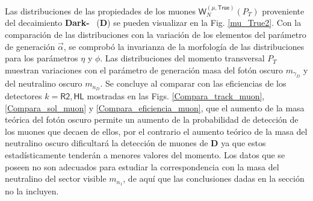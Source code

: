 Las distribuciones de las propiedades de los muones $\textsf{W}^{(\mu,\textsf{True})}_N (P_T)$ proveniente del decaimiento  \textbf{Dark-}\SUSY ~ (\MSSM\textbf{D}) 
se pueden visualizar en la Fig. \ref{mu_True2}. Con la comparación de las distribuciones con la variación de los elementos del parámetro de generación $\vec{\alpha}$, se comprobó la invarianza de la morfología de las distribuciones para los parámetros $\eta$ y $\phi$. Las distribuciones del momento transversal $P_T$ muestran variaciones con el parámetro de generación masa del fotón oscuro $m_{\gamma_D}$ y del neutralino oscuro $m_{n_D}$. Se concluye al comparar con las eficiencias de los detectores $k=\textsf{R2}, \textsf{HL}$ mostradas en las Figs. \ref{Compara_track_muon}, \ref{Compara_sol_muon} y \ref{Compara_eficiencia_muon}, que el aumento de la masa teórica del fotón oscuro permite un aumento de la probabilidad de detección de los muones que decaen de ellos, por el contrario el aumento teórico de la masa del neutralino oscuro dificultará la detección de muones de \MSSM\textbf{D} ya que estos estadísticamente tenderán a menores valores del momento. Los datos que se poseen no son adecuados para estudiar la correspondencia con la masa del neutralino del sector visible $m_{n_1}$, de aquí que las conclusiones dadas en la sección no la incluyen.




